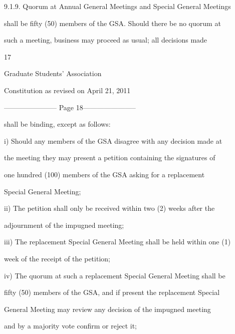 9.1.9. Quorum  at  Annual  General  Meetings  and  Special  General  Meetings  

        shall be fifty (50) members of the GSA. Should there be no quorum at  

        such  a  meeting,  business  may  proceed  as  usual;  all  decisions  made  



                                                

                                             17  



                               Graduate Students’ Association  



                          Constitution as revised on April 21, 2011  


----------------------- Page 18-----------------------

        shall be binding, except as follows:  



i)      Should any members of the GSA disagree with any decision made at  

        the  meeting  they  may  present  a  petition  containing  the  signatures  of  

        one  hundred  (100)  members  of  the  GSA  asking  for  a  replacement  

        Special General Meeting;  



ii)     The  petition  shall  only  be  received  within  two  (2)  weeks  after  the  

        adjournment of the impugned meeting;  



iii)    The replacement Special General Meeting shall be held within one (1)  

        week of the receipt of the petition;  



iv)     The quorum at such a replacement Special General Meeting shall be  

        fifty (50) members of the GSA, and if present the replacement Special  

        General  Meeting  may  review  any  decision  of  the  impugned  meeting  

        and by a majority vote confirm or reject it;  



